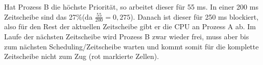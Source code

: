 \documentclass{ti2}
\begin{document}
Hat Prozess B die höchste Priorität, so arbeitet dieser für 55 ms. In einer 200 ms Zeitscheibe sind das 27\%(da $\frac{55}{200} = 0,275$). Danach ist dieser für 250 ms blockiert, also für den Rest der aktuellen Zeitscheibe gibt er die CPU an Prozess A ab. Im Laufe der nächsten Zeitscheibe wird Prozess B zwar wieder frei, muss aber bis zum nächsten Scheduling/Zeitscheibe warten und kommt somit für die komplette Zeitscheibe nicht zum Zug (rot markierte Zellen). 
\end{document}
